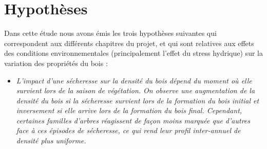 \documentclass[a4paper,12pt]{report}
\begin{document}
\section{Hypothèses}

Dans cette étude nous avons émis les trois hypothèses suivantes qui correspondent aux différents chapitres du projet, et qui sont relatives aux effets des conditions environnementales (principalement l'effet du stress hydrique) sur la variation des propriétés du bois :\\


\begin{itemize}	
	

	\item  \emph{L'impact d'une sécheresse sur la densité du bois dépend du moment où elle survient lors de la saison de végétation. On observe une augmentation de la densité du bois si la sécheresse survient lors de la formation du bois initial et inversement si elle arrive lors de la formation du bois final. Cependant, certaines familles d'arbres réagissent de façon moins marquée que d'autres face à ces épisodes de sécheresse, ce qui rend leur profil inter-annuel de densité plus uniforme.} \\
	

\end{itemize}
\end{document}
